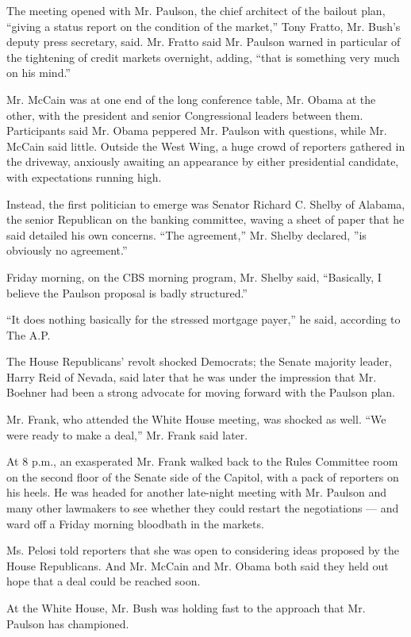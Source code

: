 The meeting opened with Mr. Paulson, the chief architect of the bailout
plan, ``giving a status report on the condition of the market,'' Tony
Fratto, Mr. Bush's deputy press secretary, said. Mr. Fratto said Mr.
Paulson warned in particular of the tightening of credit markets
overnight, adding, ``that is something very much on his mind.''

Mr. McCain was at one end of the long conference table, Mr. Obama at the
other, with the president and senior Congressional leaders between them.
Participants said Mr. Obama peppered Mr. Paulson with questions, while
Mr. McCain said little. Outside the West Wing, a huge crowd of reporters
gathered in the driveway, anxiously awaiting an appearance by either
presidential candidate, with expectations running high.

Instead, the first politician to emerge was Senator Richard C. Shelby of
Alabama, the senior Republican on the banking committee, waving a sheet
of paper that he said detailed his own concerns. ``The agreement,'' Mr.
Shelby declared, ''is obviously no agreement.''

Friday morning, on the CBS morning program, Mr. Shelby said,
``Basically, I believe the Paulson proposal is badly structured.''

``It does nothing basically for the stressed mortgage payer,'' he said,
according to The A.P.

The House Republicans' revolt shocked Democrats; the Senate majority
leader, Harry Reid of Nevada, said later that he was under the
impression that Mr. Boehner had been a strong advocate for moving
forward with the Paulson plan.

Mr. Frank, who attended the White House meeting, was shocked as well.
``We were ready to make a deal,'' Mr. Frank said later.

At 8 p.m., an exasperated Mr. Frank walked back to the Rules Committee
room on the second floor of the Senate side of the Capitol, with a pack
of reporters on his heels. He was headed for another late-night meeting
with Mr. Paulson and many other lawmakers to see whether they could
restart the negotiations --- and ward off a Friday morning bloodbath in
the markets.

Ms. Pelosi told reporters that she was open to considering ideas
proposed by the House Republicans. And Mr. McCain and Mr. Obama both
said they held out hope that a deal could be reached soon.

At the White House, Mr. Bush was holding fast to the approach that Mr.
Paulson has championed.

